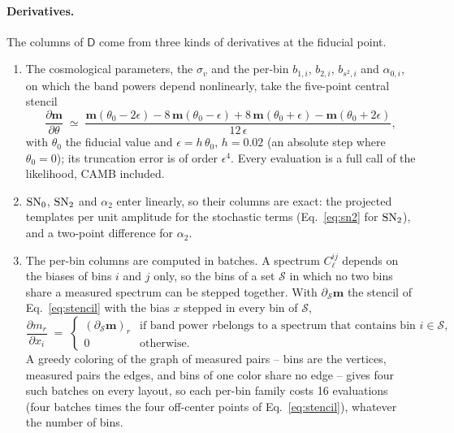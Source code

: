 \documentclass[11pt]{article}
\newcommand{\SNz}{{\rm SN}_0}
\newcommand{\SNt}{{\rm SN}_2}
\newcommand{\StepH}{0.02}
\newcommand{\Nbatch}{four}
\newcommand{\NevalFamily}{16}
\begin{document}
\paragraph{Derivatives.}
The columns of $\mathsf{D}$ come from three kinds of derivatives at the
fiducial point.
\begin{enumerate}
  \item The cosmological parameters, the $\sigma_v$ and the per-bin
    $b_{1,i}$, $b_{2,i}$, $b_{s^2,i}$ and $\alpha_{0,i}$, on which the
    band powers depend nonlinearly, take the five-point central stencil
    \begin{equation}
      \frac{\partial\mathbf{m}}{\partial\theta} \;\simeq\;
      \frac{\mathbf{m}(\theta_0 - 2\epsilon)
        - 8\,\mathbf{m}(\theta_0 - \epsilon)
        + 8\,\mathbf{m}(\theta_0 + \epsilon)
        - \mathbf{m}(\theta_0 + 2\epsilon)}{12\,\epsilon} ,
      \label{eq:stencil}
    \end{equation}
    with $\theta_0$ the fiducial value and $\epsilon = h\,\theta_0$,
    $h = \StepH$ (an absolute step where $\theta_0 = 0$); its truncation
    error is of order $\epsilon^4$.  Every evaluation is a full call of
    the likelihood, CAMB included.
  \item $\SNz$, $\SNt$ and $\alpha_2$ enter linearly, so their columns
    are exact: the projected templates per unit amplitude for the
    stochastic terms (Eq.~\eqref{eq:sn2} for $\SNt$), and a two-point
    difference for $\alpha_2$.
  \item The per-bin columns are computed in batches.  A spectrum
    $C^{ij}_\ell$ depends on the biases of bins $i$ and $j$ only, so the
    bins of a set $\mathcal{S}$ in which no two bins share a measured
    spectrum can be stepped together.  With $\partial_{\mathcal{S}}
    \mathbf{m}$ the stencil of Eq.~\eqref{eq:stencil} with the bias $x$
    stepped in every bin of $\mathcal{S}$,
    \begin{equation}
      \frac{\partial m_r}{\partial x_i} \;=\;
      \begin{cases}
        (\partial_{\mathcal{S}}\mathbf{m})_r & \text{if band power $r$
          belongs to a spectrum that contains bin } i \in \mathcal{S} ,
          \\
        0 & \text{otherwise.}
      \end{cases}
      \label{eq:batch}
    \end{equation}
    A greedy coloring of the graph of measured pairs -- bins are the
    vertices, measured pairs the edges, and bins of one color share no
    edge -- gives \Nbatch{} such batches on every layout, so each
    per-bin family costs \NevalFamily{} evaluations (\Nbatch{} batches
    times the four off-center points of Eq.~\eqref{eq:stencil}),
    whatever the number of bins.
\end{enumerate}
\end{document}
